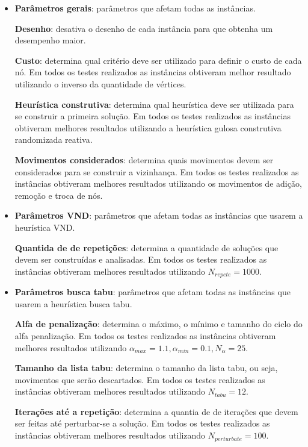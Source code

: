\documentclass[conference,compsoc]{IEEEtran}
\begin{document}
\begin{itemize}
    \item \textbf{Parâmetros gerais}: parâmetros que afetam todas as instâncias.
    
        \subitem \textbf{Desenho}: desativa o desenho de cada instância para que obtenha um desempenho maior.
    
        \subitem \textbf{Custo}: determina qual critério deve ser utilizado para definir o custo de cada nó. Em todos os testes realizados as instâncias obtiveram melhor resultado utilizando o inverso da quantidade de vértices.
    
        \subitem \textbf{Heurística construtiva}: determina qual heurística deve ser utilizada para se construir a primeira solução. Em todos os testes realizados as instâncias obtiveram melhores resultados utilizando a heurística gulosa construtiva randomizada reativa.
    
        \subitem \textbf{Movimentos considerados}: determina quais movimentos devem ser considerados para se construir a vizinhança. Em todos os testes realizados as instâncias obtiveram melhores resultados utilizando os movimentos de adição, remoção e troca de nós.
    
    \item \textbf{Parâmetros VND}: parâmetros que afetam todas as instâncias que usarem a heurística VND.
    
        \subitem \textbf{Quantida de de repetições}: determina a quantidade de soluções que devem ser construídas e analisadas. Em todos os testes realizados as instâncias obtiveram melhores resultados utilizando $N_{repete} = 1000$.
    
    \item \textbf{Parâmetros busca tabu}: parâmetros que afetam todas as instâncias que usarem a heurística busca tabu.
    
        \subitem \textbf{Alfa de penalização}: determina o máximo, o mínimo e tamanho do ciclo do alfa penalização. Em todos os testes realizados as instâncias obtiveram melhores resultados utilizando $\alpha_{max} = 1.1, \alpha_{min} = 0.1, N_{\alpha} = 25$.
    
        \subitem \textbf{Tamanho da lista tabu}: determina o tamanho da lista tabu, ou seja, movimentos que serão descartados. Em todos os testes realizados as instâncias obtiveram melhores resultados utilizando $N_{tabu} = 12$.
    
        \subitem \textbf{Iterações até a repetição}: determina a quantia de de iterações que devem ser feitas até perturbar-se a solução. Em todos os testes realizados as instâncias obtiveram melhores resultados utilizando $N_{perturbate} = 100$.
    

\end{itemize}
\end{document}
